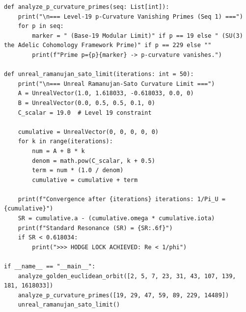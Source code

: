 \begin{verbatim}
def analyze_p_curvature_primes(seq: List[int]):
    print("\n=== Level-19 p-Curvature Vanishing Primes (Seq 1) ===")
    for p in seq:
        marker = " (Base-19 Modular Limit)" if p == 19 else " (SU(3) the Adelic Cohomology Framework Prime)" if p == 229 else ""
        print(f"Prime p={p}{marker} -> p-curvature vanishes.")

def unreal_ramanujan_sato_limit(iterations: int = 50):
    print("\n=== Unreal Ramanujan-Sato Curvature Limit ===")
    A = UnrealVector(1.0, 1.618033, -0.618033, 0.0, 0)
    B = UnrealVector(0.0, 0.5, 0.5, 0.1, 0)
    C_scalar = 19.0  # Level 19 constraint
    
    cumulative = UnrealVector(0, 0, 0, 0, 0)
    for k in range(iterations):
        num = A + B * k
        denom = math.pow(C_scalar, k + 0.5)
        term = num * (1.0 / denom)
        cumulative = cumulative + term
        
    print(f"Convergence after {iterations} iterations: 1/Pi_U = {cumulative}")
    SR = cumulative.a - (cumulative.omega * cumulative.iota)
    print(f"Standard Resonance (SR) = {SR:.6f}")
    if SR < 0.618034:
        print(">>> HODGE LOCK ACHIEVED: Re < 1/phi")

if __name__ == "__main__":
    analyze_golden_euclidean_orbit([2, 5, 7, 23, 31, 43, 107, 139, 181, 1618033])
    analyze_p_curvature_primes([19, 29, 47, 59, 89, 229, 14489])
    unreal_ramanujan_sato_limit()
\end{verbatim}

